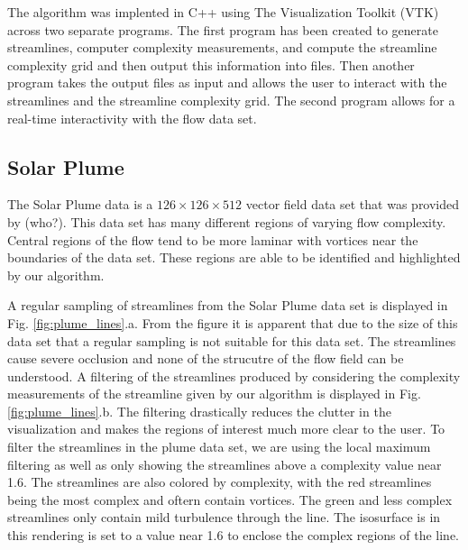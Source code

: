 \documentclass{egpubl}
\begin{document}
The algorithm was implented in C++ using The Visualization Toolkit (VTK) across two separate programs.
The first program has been created to generate streamlines, computer complexity measurements, and compute the streamline complexity grid and then output this information into files.
Then another program takes the output files as input and allows the user to interact with the streamlines and the streamline complexity grid.
The second program allows for a real-time interactivity with the flow data set.

\subsection{Solar Plume}

The Solar Plume data is a $126 \times 126 \times 512$ vector field data set that was provided by (who?).
This data set has many different regions of varying flow complexity.
Central regions of the flow tend to be more laminar with vortices near the boundaries of the data set.
These regions are able to be identified and highlighted by our algorithm.

A regular sampling of streamlines from the Solar Plume data set is displayed in Fig. \ref{fig:plume_lines}.a.
From the figure it is apparent that due to the size of this data set that a regular sampling is not suitable for this data set.
The streamlines cause severe occlusion and none of the strucutre of the flow field can be understood.
A filtering of the streamlines produced by considering the complexity measurements of the streamline given by our algorithm is displayed in Fig. \ref{fig:plume_lines}.b.
The filtering drastically reduces the clutter in the visualization and makes the regions of interest much more clear to the user.
To filter the streamlines in the plume data set, we are using the local maximum filtering as well as only showing the streamlines above a complexity value near 1.6.
The streamlines are also colored by complexity, with the red streamlines being the most complex and oftern contain vortices.
The green and less complex streamlines only contain mild turbulence through the line.
The isosurface is in this rendering is set to a value near 1.6 to enclose the complex regions of the line.
\end{document}
